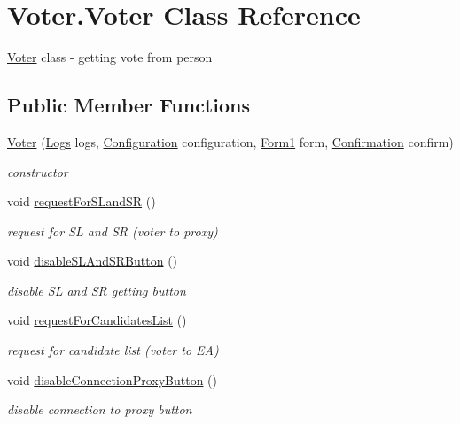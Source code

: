 \hypertarget{class_voter_1_1_voter}{}\section{Voter.\+Voter Class Reference}
\label{class_voter_1_1_voter}


\hyperlink{class_voter_1_1_voter}{Voter} class -\/ getting vote from person  


\subsection*{Public Member Functions}
\begin{DoxyCompactItemize}
\item 
\hyperlink{class_voter_1_1_voter_a659d64924100badf22d6e4ab6b27b10b}{Voter} (\hyperlink{class_voter_1_1_logs}{Logs} logs, \hyperlink{class_voter_1_1_configuration}{Configuration} configuration, \hyperlink{class_voter_1_1_form1}{Form1} form, \hyperlink{class_voter_1_1_confirmation}{Confirmation} confirm)
\begin{DoxyCompactList}\small\item\em constructor \end{DoxyCompactList}\item 
void \hyperlink{class_voter_1_1_voter_a4c06e89ca81067c0f8e405bc3bbc1946}{request\+For\+S\+Land\+S\+R} ()
\begin{DoxyCompactList}\small\item\em request for S\+L and S\+R (voter to proxy) \end{DoxyCompactList}\item 
void \hyperlink{class_voter_1_1_voter_ad45bb52a29505df92a2a8d877cb75c03}{disable\+S\+L\+And\+S\+R\+Button} ()
\begin{DoxyCompactList}\small\item\em disable S\+L and S\+R getting button \end{DoxyCompactList}\item 
void \hyperlink{class_voter_1_1_voter_a15b6ebde39984a8447164bffdabf2718}{request\+For\+Candidates\+List} ()
\begin{DoxyCompactList}\small\item\em request for candidate list (voter to E\+A) \end{DoxyCompactList}\item 
void \hyperlink{class_voter_1_1_voter_a75978572b738eddd7af0e74823683585}{disable\+Connection\+Proxy\+Button} ()
\begin{DoxyCompactList}\small\item\em disable connection to proxy button \end{DoxyCompactList}\item 

\end{DoxyCompactItemize}

